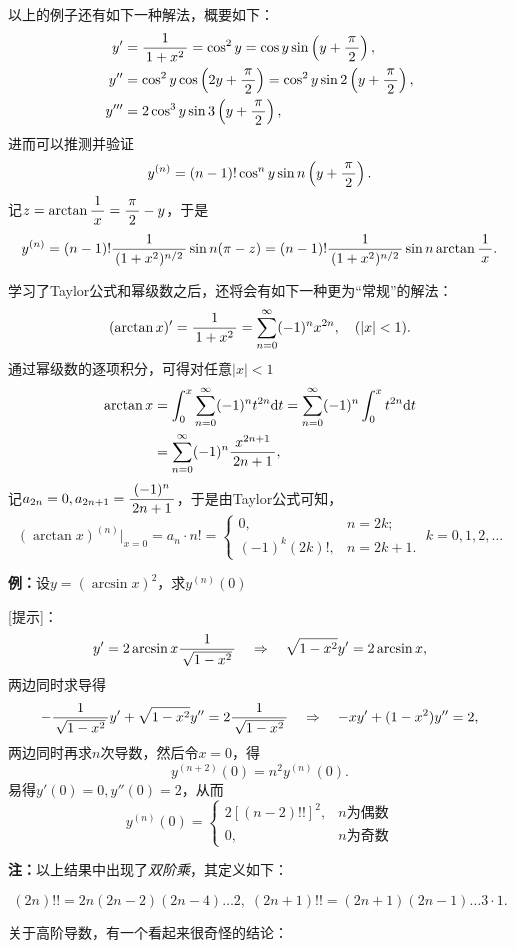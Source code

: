 \begin{shaded}
以上的例子还有如下一种解法，概要如下：
\begin{align*}
	y'&=\displaystyle\frac{\,{1}\,}{\,{1+x^2}\,}=\cos^2y=\cos y\sin\left(y+\displaystyle\frac{\,{\pi}\,}{\,{2}\,}\right),\\
	y''&=\cos^2y\cos\left(2y+\displaystyle\frac{\,{\pi}\,}{\,{2}\,}\right)
	=\cos^2y\sin2\left(y+\displaystyle\frac{\,{\pi}\,}{\,{2}\,}\right),\\
	y'''&=2\cos^3y\sin3\left(y+\displaystyle\frac{\,{\pi}\,}{\,{2}\,}\right),
\end{align*}
进而可以推测并验证
$$y^{(n)}=(n-1)!\cos^ny\sin n\left(y+\displaystyle\frac{\,{\pi}\,}{\,{2}\,}\right).$$
记$z=\arctan\displaystyle\frac{\,{1}\,}{\,{x}\,}=\displaystyle\frac{\,{\pi}\,}{\,{2}\,}-y$，于是
$$y^{(n)}=(n-1)!\displaystyle\frac{\,{1}\,}{\,{(1+x^2)^{n/2}}\,}\sin n(\pi-z)=
(n-1)!\displaystyle\frac{\,{1}\,}{\,{(1+x^2)^{n/2}}\,}\sin n\arctan\displaystyle\frac{\,{1}\,}{\,{x}\,}.$$

学习了Taylor公式和幂级数之后，还将会有如下一种更为“常规”的解法：
$$(\arctan x)'=\displaystyle\frac{\,{1}\,}{\,{1+x^2}\,}=\sum\limits_{n=0}^{\infty}(-1)^nx^{2n},
\quad (|x|<1).$$ 
通过幂级数的逐项积分，可得对任意$|x|<1$
\begin{align*}
	\arctan x&=\displaystyle\int_0^x\sum\limits_{n=0}^{\infty}(-1)^nt^{2n}\mathrm{d} t
	=\sum\limits_{n=0}^{\infty}(-1)^n\displaystyle\int_0^xt^{2n}\mathrm{d} t\\
	&=\sum\limits_{n=0}^{\infty}(-1)^n\displaystyle\frac{\,{x^{2n+1}}\,}{\,{2n+1}\,},
\end{align*}
记$a_{2n}=0,a_{2n+1}=\displaystyle\frac{\,{(-1)^n}\,}{\,{2n+1}\,}$，于是由Taylor公式可知，
$$(\arctan x)^{(n)}|_{x=0}=a_n\cdot n!
=\left\{\begin{array}{ll}
	0,& n=2k;\\ (-1)^k(2k)!, & n=2k+1.
\end{array}\right.\;k=0,1,2,\ldots$$
\end{shaded}

{\bf 例：}设$y=(\arcsin x)^2$，求$y^{(n)}(0)$

[提示]：
$$y'=2\arcsin x\displaystyle\frac{\,{1}\,}{\,{\sqrt{1-x^2}}\,}\quad
\Rightarrow\quad \sqrt{1-x^2}y'=2\arcsin x,$$
两边同时求导得
$$-\displaystyle\frac{\,{1}\,}{\,{\sqrt{1-x^2}}\,}y'+\sqrt{1-x^2}y''=2\displaystyle\frac{\,{1}\,}{\,{\sqrt{1-x^2}}\,}\quad
\Rightarrow\quad-xy'+(1-x^2)y''=2,$$
两边同时再求$n$次导数，然后令$x=0$，得
$$y^{(n+2)}(0)=n^2y^{(n)}(0).$$
易得$y'(0)=0,y''(0)=2$，从而
$$y^{(n)}(0)=\left\{\begin{array}{ll}
2[(n-2)!!]^2,& n\mbox{为偶数}\\
0,& n\mbox{为奇数}
\end{array}\right.$$

{\bf 注：}以上结果中出现了{\it 双阶乘}，其定义如下：
\begin{thx}
	$$(2n)!!=2n(2n-2)(2n-4)\ldots2,\;(2n+1)!!=(2n+1)(2n-1)\ldots3\cdot1.$$
\end{thx}

关于高阶导数，有一个看起来很奇怪的结论：

